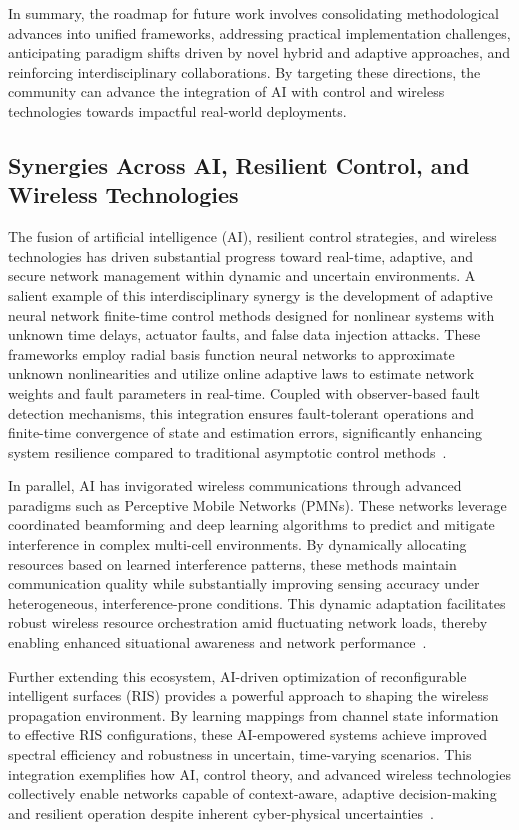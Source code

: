 \documentclass[sigconf]{acmart}
\begin{document}
In summary, the roadmap for future work involves consolidating methodological advances into unified frameworks, addressing practical implementation challenges, anticipating paradigm shifts driven by novel hybrid and adaptive approaches, and reinforcing interdisciplinary collaborations. By targeting these directions, the community can advance the integration of AI with control and wireless technologies towards impactful real-world deployments.

\subsection{Synergies Across AI, Resilient Control, and Wireless Technologies}

The fusion of artificial intelligence (AI), resilient control strategies, and wireless technologies has driven substantial progress toward real-time, adaptive, and secure network management within dynamic and uncertain environments. A salient example of this interdisciplinary synergy is the development of adaptive neural network finite-time control methods designed for nonlinear systems with unknown time delays, actuator faults, and false data injection attacks. These frameworks employ radial basis function neural networks to approximate unknown nonlinearities and utilize online adaptive laws to estimate network weights and fault parameters in real-time. Coupled with observer-based fault detection mechanisms, this integration ensures fault-tolerant operations and finite-time convergence of state and estimation errors, significantly enhancing system resilience compared to traditional asymptotic control methods~\cite{ref46}.

In parallel, AI has invigorated wireless communications through advanced paradigms such as Perceptive Mobile Networks (PMNs). These networks leverage coordinated beamforming and deep learning algorithms to predict and mitigate interference in complex multi-cell environments. By dynamically allocating resources based on learned interference patterns, these methods maintain communication quality while substantially improving sensing accuracy under heterogeneous, interference-prone conditions. This dynamic adaptation facilitates robust wireless resource orchestration amid fluctuating network loads, thereby enabling enhanced situational awareness and network performance~\cite{ref47}.

Further extending this ecosystem, AI-driven optimization of reconfigurable intelligent surfaces (RIS) provides a powerful approach to shaping the wireless propagation environment. By learning mappings from channel state information to effective RIS configurations, these AI-empowered systems achieve improved spectral efficiency and robustness in uncertain, time-varying scenarios. This integration exemplifies how AI, control theory, and advanced wireless technologies collectively enable networks capable of context-aware, adaptive decision-making and resilient operation despite inherent cyber-physical uncertainties~\cite{ref48}.
\end{document}
